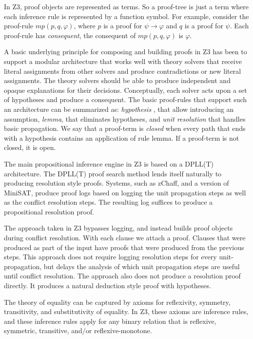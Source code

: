\documentclass{llncs}
\begin{document}
In Z3, proof objects are represented as terms. So a proof-tree is just a term
where each inference rule is represented by a function symbol.
For example, consider the proof-rule $mp(p, q, \varphi)$, where $p$ is a proof for
$\psi \rightarrow \varphi$ and $q$ is a proof for $\psi$. Each proof-rule has
\emph{consequent}, the consequent of $mp(p, q, \varphi)$ is $\varphi$.

A basic underlying principle for composing and building proofs in Z3 has been to support a modular
architecture that works well with theory solvers that receive literal assignments from other solvers and
produce contradictions or new literal assignments. The theory solvers should be able to produce independent
and opaque explanations for their decisions.
Conceptually, each solver acts upon a set of hypotheses and produce a consequent. The basic proof-rules
that support such an architecture can be summarized as: \emph{hypothesis} , that allow introducing an
assumption, \emph{lemma}, that eliminates hypotheses, and \emph{unit resolution} that handles basic propagation.
We say that a proof-term is \emph{closed} when every path that ends with a hypothesis contains an application
of rule lemma. If a proof-term is not closed, it is open.

The main propositional inference engine in Z3 is based on a DPLL(T) architecture.
The DPLL(T) proof search method lends itself naturally to producing resolution style proofs.
Systems, such as zChaff, and a version of MiniSAT, produce proof logs based on logging the
unit propagation steps as well as the conflict resolution steps. The resulting log suffices to produce a
propositional resolution proof.

The approach taken in Z3 bypasses logging, and instead builds proof
objects during conflict resolution.  With each clause we attach a
proof. Clauses that were produced as part of the input have proofs
that were produced from the previous steps. This approach does not
require logging resolution steps for every unit-propagation, but
delays the analysis of which unit propagation steps are useful until
conflict resolution. The approach also does not produce a resolution
proof directly. It produces a natural deduction style proof with
hypotheses.

The theory of equality can be captured by axioms for reflexivity,
symmetry, transitivity, and substitutivity of equality. In Z3,
these axioms are inference rules, and these inference rules apply
for any binary relation that is reflexive,
symmetric, transitive, and/or reflexive-monotone.
\end{document}
